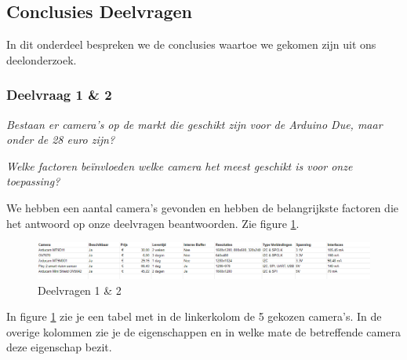 \documentclass{article}
\begin{document}
\subsection{Conclusies Deelvragen}
In dit onderdeel bespreken we de conclusies waartoe we gekomen zijn uit ons deelonderzoek.

\subsubsection{Deelvraag 1 {\&} 2}
\textit{Bestaan er camera’s op de markt die geschikt zijn voor de Arduino Due, maar onder de 28 euro zijn?}


\textit{Welke factoren beïnvloeden welke camera het meest geschikt is voor onze toepassing?}

We hebben een aantal camera's gevonden en hebben de belangrijkste factoren die het antwoord op onze deelvragen beantwoorden.
Zie figure \ref{fig:deelvragen1en2}.


\begin{figure}[h]
	\includegraphics[width=40em]{table2}
	\centering
	\caption{Deelvragen 1 {\&} 2}
	\label{fig:deelvragen1en2}
	\end{figure}

In figure \ref{fig:deelvragen1en2} zie je een tabel met in de linkerkolom de 5 gekozen camera's. In de overige kolommen zie je de eigenschappen en in welke mate de betreffende camera deze eigenschap bezit.
\end{document}
